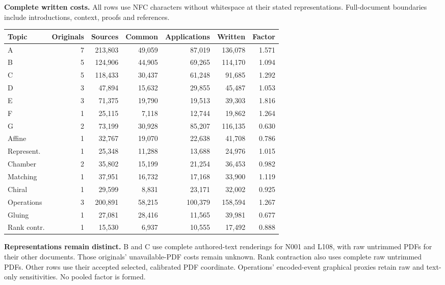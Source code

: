 \documentclass[11pt,a4paper]{article}
\newcommand{\tabsetup}{\small\setlength{\tabcolsep}{4pt}\renewcommand{\arraystretch}{1.10}}
\begin{document}
\textbf{Complete written costs.} All rows use NFC characters without whitespace at their stated representations. Full-document boundaries include introductions, context, proofs and references.
\begin{center}\tabsetup\begin{tabular}{lrrrrrr}\toprule
Topic & Originals & Sources & Common & Applications & Written & Factor\\\midrule
A & 7 & 213,803 & 49,059 & 87,019 & 136,078 & 1.571 \\
B & 5 & 124,906 & 44,905 & 69,265 & 114,170 & 1.094 \\
C & 5 & 118,433 & 30,437 & 61,248 & 91,685 & 1.292 \\
D & 3 & 47,894 & 15,632 & 29,855 & 45,487 & 1.053 \\
E & 3 & 71,375 & 19,790 & 19,513 & 39,303 & 1.816 \\
F & 1 & 25,115 & 7,118 & 12,744 & 19,862 & 1.264 \\
G & 2 & 73,199 & 30,928 & 85,207 & 116,135 & 0.630 \\
Affine & 1 & 32,767 & 19,070 & 22,638 & 41,708 & 0.786 \\
Represent. & 1 & 25,348 & 11,288 & 13,688 & 24,976 & 1.015 \\
Chamber & 2 & 35,802 & 15,199 & 21,254 & 36,453 & 0.982 \\
Matching & 1 & 37,951 & 16,732 & 17,168 & 33,900 & 1.119 \\
Chiral & 1 & 29,599 & 8,831 & 23,171 & 32,002 & 0.925 \\
Operations & 3 & 200,891 & 58,215 & 100,379 & 158,594 & 1.267 \\
Gluing & 1 & 27,081 & 28,416 & 11,565 & 39,981 & 0.677 \\
Rank contr. & 1 & 15,530 & 6,937 & 10,555 & 17,492 & 0.888 \\
\bottomrule\end{tabular}\end{center}
\textbf{Representations remain distinct.} B and C use complete authored-text renderings for N001 and L108, with raw untrimmed PDFs for their other documents. Those originals' unavailable-PDF costs remain unknown. Rank contraction also uses complete raw untrimmed PDFs. Other rows use their accepted selected, calibrated PDF coordinate. Operations' encoded-event graphical proxies retain raw and text-only sensitivities. No pooled factor is formed.
\end{document}
